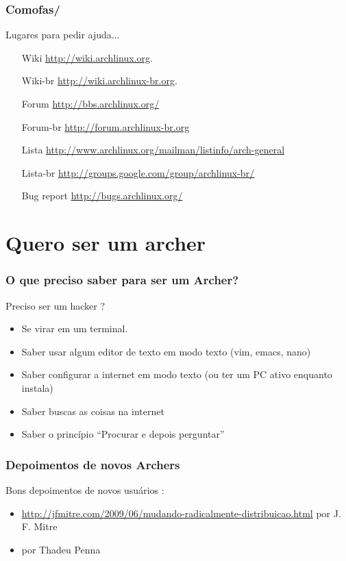 \documentclass{beamer}
\begin{document}
\begin{frame}
    \frametitle{Comofas/}
    \begin{block}{Lugares para pedir ajuda...}
        \begin{itemize}
            \centering
            \item[Wiki] \url{http://wiki.archlinux.org}. 
            \item[Wiki-br] \url{http://wiki.archlinux-br.org}. 
            \item[Forum] \url{http://bbs.archlinux.org/}  
            \item[Forum-br] \url{http://forum.archlinux-br.org}%
            \item[Lista] \url{http://www.archlinux.org/mailman/listinfo/arch-general}
            \item[Lista-br] \url{http://groups.google.com/group/archlinux-br/}
            \item[Bug report] \url{http://bugs.archlinux.org/} 
        \end{itemize}
    \end{block}        

\end{frame}


\section{Quero ser um archer }
    
\begin{frame}
    \frametitle{O que preciso saber para ser um Archer?}
    \begin{block}{Preciso ser um hacker ?}
        \begin{itemize}
            \item<1-> Se virar em um terminal. 
            \item<2-> Saber usar algum editor de texto em modo texto (vim, emacs, nano) 
            \item<3-> Saber configurar a internet em modo texto (ou ter um PC ativo enquanto instala)
            \item<4-> Saber buscas as coisas na internet
            \item<5-> Saber o princípio ``Procurar e depois perguntar''
        \end{itemize}
    \end{block}
\end{frame}

\begin{frame}
        \frametitle{Depoimentos de novos Archers}
        \begin{block}{Bons depoimentos de novos usuários :}
            \begin{itemize}
                \item \url{http://jfmitre.com/2009/06/mudando-radicalmente-distribuicao.html} por J. F. Mitre
                \item por Thadeu Penna
            \end{itemize}
        \end{block}
\end{frame}
\end{document}

